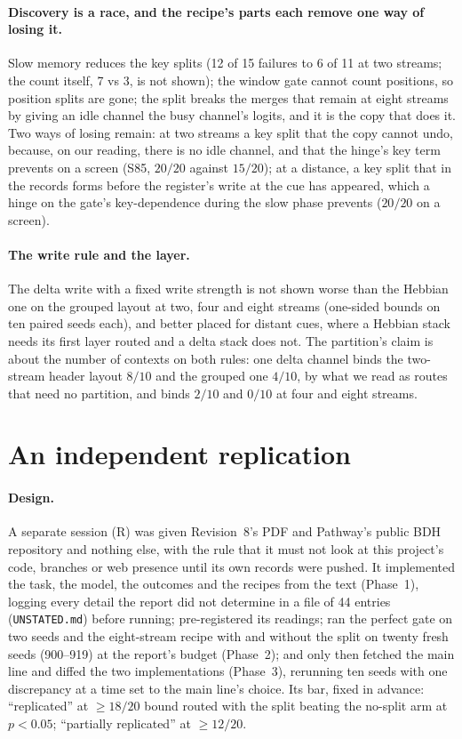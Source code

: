 \documentclass[11pt]{article}
\begin{document}
\paragraph{Discovery is a race, and the recipe's parts each remove one way of losing it.} Slow memory reduces the key splits (12 of 15 failures to 6 of 11 at two streams; the count itself, 7 vs 3, is not shown); the window gate cannot count positions, so position splits are gone; the split breaks the merges that remain at eight streams by giving an idle channel the busy channel's logits, and it is the copy that does it. Two ways of losing remain: at two streams a key split that the copy cannot undo, because, on our reading, there is no idle channel, and that the hinge's key term prevents on a screen (S85, $20/20$ against $15/20$); at a distance, a key split that in the records forms before the register's write at the cue has appeared, which a hinge on the gate's key-dependence during the slow phase prevents ($20/20$ on a screen).

\paragraph{The write rule and the layer.} The delta write with a fixed write strength is not shown worse than the Hebbian one on the grouped layout at two, four and eight streams (one-sided bounds on ten paired seeds each), and better placed for distant cues, where a Hebbian stack needs its first layer routed and a delta stack does not. The partition's claim is about the number of contexts on both rules: one delta channel binds the two-stream header layout $8/10$ and the grouped one $4/10$, by what we read as routes that need no partition, and binds $2/10$ and $0/10$ at four and eight streams.

\section{An independent replication}
\label{sec:replication}

\paragraph{Design.} A separate session (R) was given Revision~8's PDF and Pathway's public BDH repository and nothing else, with the rule that it must not look at this project's code, branches or web presence until its own records were pushed. It implemented the task, the model, the outcomes and the recipes from the text (Phase~1), logging every detail the report did not determine in a file of 44 entries (\texttt{UNSTATED.md}) before running; pre-registered its readings; ran the perfect gate on two seeds and the eight-stream recipe with and without the split on twenty fresh seeds (900--919) at the report's budget (Phase~2); and only then fetched the main line and diffed the two implementations (Phase~3), rerunning ten seeds with one discrepancy at a time set to the main line's choice. Its bar, fixed in advance: ``replicated'' at $\geq 18/20$ bound routed with the split beating the no-split arm at $p < 0.05$; ``partially replicated'' at $\geq 12/20$.
\end{document}
